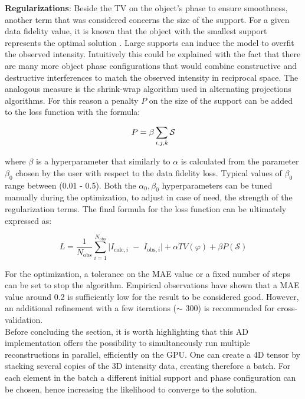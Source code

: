 \textbf{Regularizations}:
Beside the TV on the object's phase to ensure smoothness, another term that was considered concerns the size of the support. 
For a given data fidelity value, it is known that the object with the smallest support represents the optimal solution 
\cite{favre-nicolin_free_2020}. Large supports can induce the model to overfit the observed intensity. Intuitively this 
could be explained with the fact that there are many more object phase configurations 
that would combine constructive and destructive interferences to match the observed intensity in reciprocal space. 
The analogous measure is the shrink-wrap algorithm \cite{Marchesini_shrinkwrap} used in alternating projections algorithms.  
For this reason a penalty $P$ on the size of the support can be added to the loss function with the formula: 

\begin{equation}
    \centering
    P = \beta  \sum_{i,j,k} \mathcal S
\end{equation}

where $\beta$ is a hyperparameter that similarly to $\alpha$ is calculated from the parameter $\beta_0$ chosen by the 
user with respect to the data fidelity loss. Typical values of $\beta_0$ range between (0.01 - 0.5).
Both the $\alpha_0, \beta_0$ hyperparameters can be tuned manually during the optimization, to adjust in case of need, the strength of 
the regularization terms.
The final formula for the loss function can be ultimately expressed as: 

\begin{equation}
       L = \frac{1}{N_{\mathrm{obs}}}
       \sum_{i=1}^{N_{\mathrm{obs}}}
       \bigl\lvert I_{\mathrm{calc},i} \;-\; I_{\mathrm{obs},i}\bigr\rvert  
        + \alpha TV(\varphi)
        + \beta  P(\mathcal S)
\end{equation}

For the optimization, a tolerance on the MAE value or a fixed number of steps can be set to stop the algorithm. Empirical 
observations have shown that a MAE value around 0.2 is sufficiently low for the result to be considered good. However, 
an additional refinement with a few iterations ($\sim$ 300) is recommended for cross-validation.  \\

Before concluding the section, it is worth highlighting that this AD implementation offers the possibility to simultaneously 
run multiple reconstructions in parallel, efficiently on the GPU. One can create a 4D tensor by stacking several copies of the 3D 
intensity data, creating therefore a batch. For each element in the batch a different initial support and phase configuration 
can be chosen, hence increasing the likelihood to converge to the solution. 

